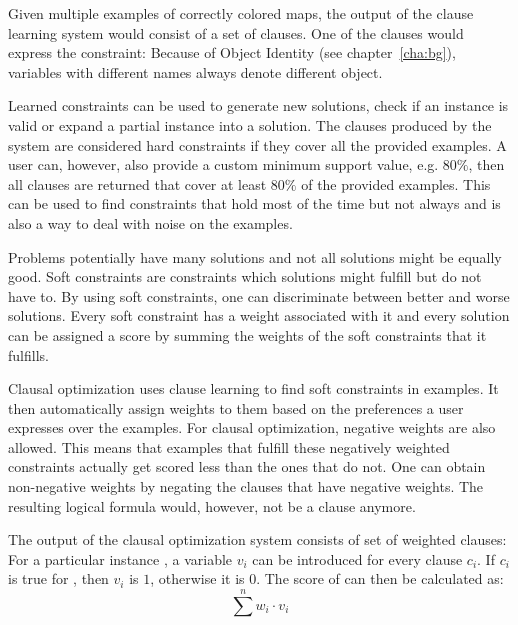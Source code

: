 \begin{ex}
Given multiple examples of correctly colored maps, the output of the clause learning system would consist of a set of clauses. One of the clauses would express the constraint: 
Because of Object Identity (see chapter~\ref{cha:bg}), variables with different names always denote different object.
\end{ex}

Learned constraints can be used to generate new solutions, check if an instance is valid or expand a partial instance into a solution.
The clauses produced by the system are considered hard constraints if they cover all the provided examples.
A user can, however, also provide a custom minimum support value, e.g. $80\%$, then all clauses are returned that cover at least $80\%$ of the provided examples.
This can be used to find constraints that hold most of the time but not always and is also a way to deal with noise on the examples.

Problems potentially have many solutions and not all solutions might be equally good.
Soft constraints are constraints which solutions might fulfill but do not have to.
By using soft constraints, one can discriminate between better and worse solutions.
Every soft constraint has a weight associated with it and every solution can be assigned a score by summing the weights of the soft constraints that it fulfills.

Clausal optimization uses clause learning to find soft constraints in examples.
It then automatically assign weights to them based on the preferences a user expresses over the examples.
For clausal optimization, negative weights are also allowed.
This means that examples that fulfill these negatively weighted constraints actually get scored less than the ones that do not.
One can obtain non-negative weights by negating the clauses that have negative weights.
The resulting logical formula would, however, not be a clause anymore.

The output of the clausal optimization system consists of set of weighted clauses: 
For a particular instance , a variable $v_i$ can be introduced for every clause $c_i$.
If $c_i$ is true for , then $v_i$ is $1$, otherwise it is $0$. The score of  can then be calculated as:
\begin{equation}
\sum\limits^n w_i \cdot v_i
\end{equation}

